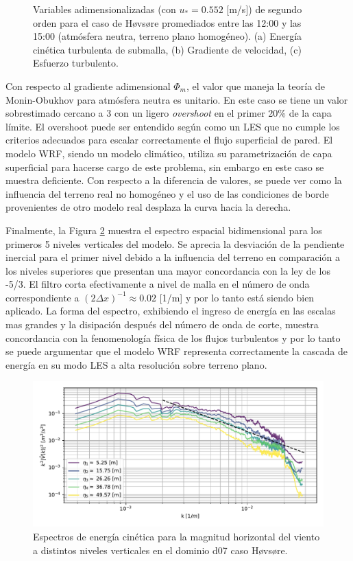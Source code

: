 \begin{figure}[H]
\begin{center}
	\end{center}
	\caption{Variables adimensionalizadas (con $u_* = 0.552$ [m/s]) de segundo orden para el caso de Høvsøre promediados entre las 12:00 y las 15:00 (atmósfera neutra, terreno plano homogéneo). (a) Energía cinética turbulenta de submalla, (b) Gradiente de velocidad, (c) Esfuerzo turbulento. }
	\label{fig:06_hov_mean_secondorder}
\end{figure}

Con respecto al gradiente adimensional $\Phi_m$, el valor que maneja la teoría de Monin-Obukhov para atmósfera neutra es unitario. En este caso se tiene un valor sobrestimado cercano a $3$ con un ligero \emph{overshoot} en el primer 20\% de la capa límite. El overshoot puede ser entendido según \cite{doi:10.1063/1.3319073} como un LES que no cumple los criterios adecuados para escalar correctamente el flujo superficial de pared. El modelo WRF, siendo un modelo climático, utiliza su parametrización de capa superficial para hacerse cargo de este problema, sin embargo en este caso se muestra deficiente. Con respecto a la diferencia de valores, se puede ver como la influencia del terreno real no homogéneo y el uso de las condiciones de borde provenientes de otro modelo real desplaza la curva hacia la derecha.

Finalmente, la Figura \ref{fig:06_hov_spectrum} muestra el espectro espacial bidimensional para los primeros 5 niveles verticales del modelo. Se aprecia la desviación de la pendiente inercial para el primer nivel debido a la influencia del terreno en comparación a los niveles superiores que presentan una mayor concordancia con la ley de los -5/3. El filtro corta efectivamente a nivel de malla en el número de onda correspondiente a $(2\Delta x)^{-1}\approx 0.02$ [1/m] y por lo tanto está siendo bien aplicado. La forma del espectro, exhibiendo el ingreso de energía en las escalas mas grandes y la disipación después del número de onda de corte, muestra concordancia con la fenomenología física de los flujos turbulentos y por lo tanto se puede argumentar que el modelo WRF representa correctamente la cascada de energía en su modo LES a alta resolución sobre terreno plano.
\begin{figure}[H]
	\centering
	\includegraphics[width=1.0\linewidth,page=1,trim={3mm 5mm 3mm 3mm},clip]{Imagenes/06/hov/spectra}%
	\caption{Espectros de energía cinética para la magnitud horizontal del viento a distintos niveles verticales en el dominio d07 caso Høvsøre.}
	\label{fig:06_hov_spectrum}
\end{figure}

